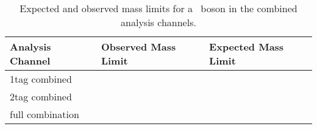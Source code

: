 \begin{table}
\begin{center}
\begin{tabular}{|l|l|l|}
\hline
Analysis Channel & Observed Mass Limit & Expected Mass Limit\\
\hline
1tag combined & & \\
2tag combined & & \\
full combination & & \\
\hline
\end{tabular}
\caption{Expected and observed mass limits for a \WprimeL\ boson in the combined analysis channels.}
\label{TABLE-RESULTS-WPRIMELCOMBLIMITS}
\end{center}
\end{table}





